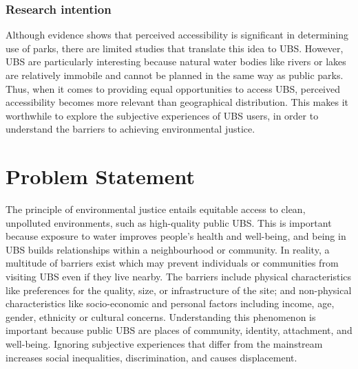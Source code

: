 \documentclass{article}
\begin{document}
\subsubsection{Research intention}

Although evidence shows that perceived accessibility is significant in determining use of parks, there are limited studies that translate this idea to UBS.
However, UBS are particularly interesting because natural water bodies like rivers or lakes are relatively immobile and cannot be planned in the same way as public parks. 
Thus, when it comes to providing equal opportunities to access UBS, perceived accessibility becomes more relevant than geographical distribution. 
This makes it worthwhile to explore the subjective experiences of UBS users, in order to understand the barriers to achieving environmental justice.


\section{Problem Statement}

The principle of environmental justice entails equitable access to clean, unpolluted environments, such as high-quality public UBS. This is important because exposure to water improves people's health and well-being, and being in UBS builds relationships within a neighbourhood or community.
In reality, a multitude of barriers exist which may prevent individuals or communities from visiting UBS even if they live nearby. The barriers include physical characteristics like preferences for the quality, size, or infrastructure of the site; and non-physical characteristics like socio-economic and personal factors including income, age, gender, ethnicity or cultural concerns.
Understanding this phenomenon is important because public UBS are places of community, identity, attachment, and well-being. Ignoring subjective experiences that differ from the mainstream increases social inequalities, discrimination, and causes displacement.
\end{document}
